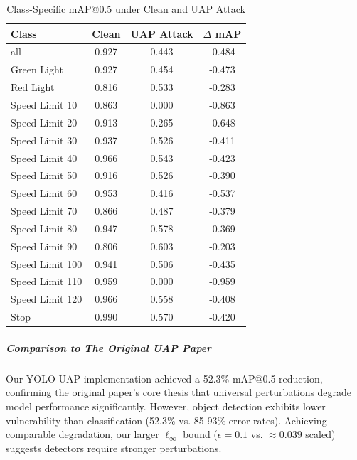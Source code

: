 \documentclass[../main.tex]{subfiles}
\begin{document}
\begin{table}[H]
    \centering
    \caption{Class-Specific mAP@0.5 under Clean and UAP Attack}
    \label{tab:yolo_uap_class_results}
    \footnotesize
    \begin{tabular}{@{\hspace{0.3cm}}lS[table-format=1.3]S[table-format=1.3]S[table-format=-1.3]@{\hspace{0.3cm}}}
        \toprule
        \textbf{Class} & {\textbf{Clean}} & {\textbf{UAP Attack}} & {\textbf{$\Delta$ mAP}} \\
        \midrule
        all            & 0.927 & 0.443 & -0.484 \\
        Green Light    & 0.927 & 0.454 & -0.473 \\
        Red Light      & 0.816 & 0.533 & -0.283 \\
        Speed Limit 10 & 0.863 & 0.000 & -0.863 \\
        Speed Limit 20 & 0.913 & 0.265 & -0.648 \\
        Speed Limit 30 & 0.937 & 0.526 & -0.411 \\
        Speed Limit 40 & 0.966 & 0.543 & -0.423 \\
        Speed Limit 50 & 0.916 & 0.526 & -0.390 \\
        Speed Limit 60 & 0.953 & 0.416 & -0.537 \\
        Speed Limit 70 & 0.866 & 0.487 & -0.379 \\
        Speed Limit 80 & 0.947 & 0.578 & -0.369 \\
        Speed Limit 90 & 0.806 & 0.603 & -0.203 \\
        Speed Limit 100 & 0.941 & 0.506 & -0.435 \\
        Speed Limit 110 & 0.959 & 0.000 & -0.959 \\
        Speed Limit 120 & 0.966 & 0.558 & -0.408 \\
        Stop           & 0.990 & 0.570 & -0.420 \\
        \bottomrule
    \end{tabular}
\end{table}

\subparagraph{Comparison to The Original UAP Paper}  
Our YOLO UAP implementation achieved a 52.3\% mAP@0.5 reduction, confirming the original paper's core thesis that universal perturbations degrade model performance significantly. However, object detection exhibits lower vulnerability than classification (52.3\% vs. 85-93\% error rates)\cite{moosavi2017universal}. Achieving comparable degradation, our larger $\ell_\infty$ bound ($\epsilon=0.1$ vs. $\approx 0.039$ scaled) suggests detectors require stronger perturbations.
\end{document}
